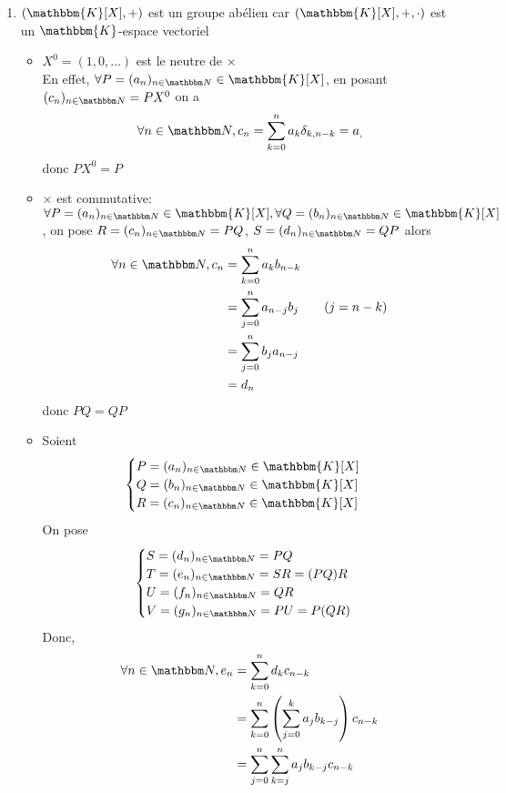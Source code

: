 \begin{prv}
	\begin{enumerate}
		\item $(\mathbbm{K}[X], +)$ est un groupe abélien car $(\mathbbm{K}[X], +, \cdot)$ est un $\mathbbm{K}$-espace vectoriel\\
			\begin{itemize}
				\item $X^0 = (1, 0, \ldots)$ est le neutre de $\times$\\
					En effet, $\forall P = (a_n)_{n\in\N} \in \mathbbm{K}[X]$, en posant $(c_n)_{n\in\N} = PX^0$ on a \[
						\forall n \in \N, c_n = \sum_{k=0}^n a_k \delta_{k, n-k} = a_,
					\] donc $PX^0 = P$
				\item $\times$ est commutative: $\forall P = (a_n)_{n\in\N} \in \mathbbm{K}[X], \forall Q = (b_n)_{n\in\N} \in \mathbbm{K}[X]$, on pose $R = (c_n)_{n\in\N} = PQ$, $S = (d_n)_{n\in\N} = QP$ alors
					\begin{align*}
						\forall n \in \N, 
						c_n &= \sum_{k=0}^n a_k b_{n-k} \\
						&= \sum_{j=0}^n a_{n-j}b_{j} \qquad (j = n-k) \\
						&= \sum_{j=0}^n b_j a_{n-j} \\
						&= d_n \\
					\end{align*}
					donc $PQ = QP$
				\item Soient  \[
						\begin{cases}
							P = (a_n)_{n\in\N} \in \mathbbm{K}[X]\\
							Q = (b_n)_{n\in\N} \in \mathbbm{K}[X]\\
							R = (c_n)_{n\in\N} \in \mathbbm{K}[X]\\
						\end{cases}
					\] On pose \[
						\begin{cases}
							S = (d_n)_{n\in\N} = PQ\\
							T = (e_n)_{n\in\N} = SR = (PQ)R\\
							U = (f_n)_{n\in\N} = QR\\
							V = (g_n)_{n\in\N} = PU = P(QR)
						\end{cases}
					\] Donc,
					\begin{align*}
						\forall n \in \N,
						e_n &= \sum_{k=0}^n d_k c_{n-k}  \\
						&= \sum_{k=0}^n\left( \sum_{j=0}^k a_{j} b_{k-j} \right)c_{n-k} \\
						&= \sum_{j=0}^n \sum_{k=j}^n a_j b_{k-j} c_{n-k} \\

\end{align*}
\end{itemize}
\end{enumerate}
\end{prv}
